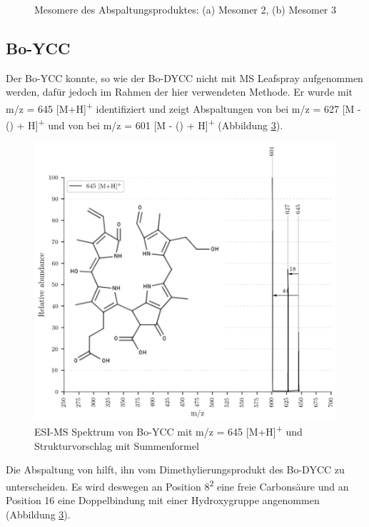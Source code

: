\begin{figure}[!htbp]
\begin{subfigure}[b]{0.5\textwidth}
    \caption{}
    \label{fig:311MHMesomer3}
  \end{subfigure}
  \caption[2 Mesomere für potentielle Abspaltungsprodukte von Bo-DNCC, Quelle: Autor]{Mesomere des Abspaltungsproduktes: (a) Mesomer 2, (b) Mesomer 3}
\end{figure}

\pagebreak
\subsection{Bo-YCC}

Der Bo-YCC konnte, so wie der Bo-DYCC nicht mit MS Leafspray aufgenommen werden, dafür jedoch im Rahmen der hier verwendeten Methode. Er wurde mit m/z = 645 [M+H]\textsuperscript{+} identifiziert und zeigt Abspaltungen von  bei m/z = 627 [M - () + H]\textsuperscript{+} und von  bei m/z = 601 [M - () + H]\textsuperscript{+} (Abbildung \ref{fig:645MH}). 

\begin{figure}[!htbp]
  \centering
  \includegraphics[width=\textwidth, height=0.8\textwidth]{figures/Kapitel7/Kataboliten/VWA_MS_645-12.png}
  \caption[ESI-MS Spektrum von Bo-YCC, Quelle: Autor]{ESI-MS Spektrum von Bo-YCC mit m/z = 645 [M+H]\textsuperscript{+} und Strukturvorschlag mit Summenformel }
  \label{fig:645MH}
\end{figure}

Die Abspaltung von  hilft, ihn vom Dimethylierungsprodukt des Bo-DYCC zu unterscheiden. Es wird deswegen an Position 8\textsuperscript{2} eine freie Carbonsäure und an Position 16 eine Doppelbindung mit einer Hydroxygruppe angenommen (Abbildung \ref{fig:645MH}).



